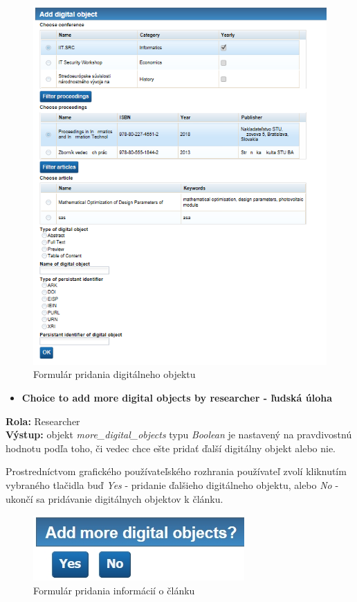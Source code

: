 \documentclass[10pt,oneside,slovak,a4paper]{article}
\begin{document}
\begin{figure} [H]
\centering
\includegraphics[scale=0.4]{forms/formAddDigital.png} 
\caption{Formulár pridania digitálneho objektu}
\end{figure}

\begin{itemize}
\item \textbf{Choice to add more digital objects by researcher
 - ľudská úloha}
\end{itemize}

\textbf{Rola:} Researcher\\
\textbf{Výstup:} objekt \textit{more\_digital\_objects} typu \textit{Boolean} je nastavený na pravdivostnú hodnotu podľa toho, či vedec chce ešte pridať ďalší digitálny objekt alebo nie.

Prostredníctvom grafického používateľského rozhrania používateľ zvolí kliknutím vybraného tlačidla buď \textit{Yes} - pridanie ďalšieho digitálneho objektu, alebo \textit{No} - ukončí sa pridávanie digitálnych objektov k článku.

\begin{figure} [H]
\centering
\includegraphics[scale=0.4]{forms/formDigitalObjects.jpg} 
\caption{Formulár pridania informácií o článku}
\end{figure}
\end{document}
